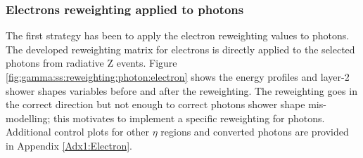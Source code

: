 \subsubsection{Electrons reweighting applied to photons}
The first strategy has been to apply the electron reweighting values to photons. The developed reweighting matrix for electrons is directly applied to the selected photons from radiative Z events. Figure \ref{fig:gamma:ss:reweighting:photon:electron} shows the energy profiles and layer-2 shower shapes variables before and after the reweighting. The reweighting goes in the correct direction but not enough to correct photons shower shape mis-modelling; this motivates to implement a specific reweighting for photons. Additional control plots for other $\eta$ regions and converted photons are provided in Appendix \ref{Adx1:Electron}.
\begin{figure}[htbp]
    \centering
	 \\

\end{figure}
